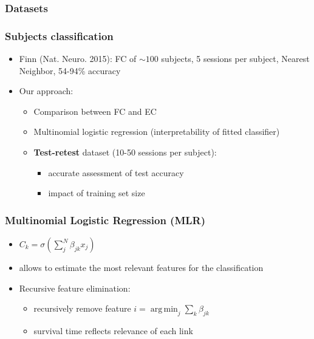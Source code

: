 \documentclass[final]{beamer}
\begin{document}
\begin{frame}
\transdissolve
\frametitle{Datasets}
	\centering
{}
\end{frame}

\begin{frame}
\transdissolve
\frametitle{Subjects classification}
\begin{itemize}
		\pause
	\item Finn (Nat. Neuro. 2015): FC of $\sim100$ subjects, 5 sessions per subject, Nearest Neighbor, 54-94\% accuracy   
		\pause
	\item Our approach:
		\pause
		\begin{itemize}
	\item Comparison between FC and EC
		\pause
	\item Multinomial logistic regression (interpretability of fitted classifier)
		\pause
	\item \textbf{Test-retest} dataset (10-50 sessions per subject): 
		\pause
		\begin{itemize}
			\item accurate assessment of test accuracy 
		\pause
			\item impact of training set size
		\end{itemize}
		\end{itemize}
\end{itemize}
\end{frame}

\begin{frame}
\transdissolve
\frametitle{Multinomial Logistic Regression (MLR)}
\begin{itemize}
	\item $C_k = \sigma(\sum_j^N \beta_{jk} x_j)$
\pause
\item allows to estimate the most relevant features for the classification
	\item Recursive feature elimination: 
		\begin{itemize}
			\item recursively remove feature $i = \operatorname*{arg\,min}_j \sum_k \beta_{jk}$
			\item survival time reflects relevance of each link
		\end{itemize}
\end{itemize}
\end{frame}
\end{document}
